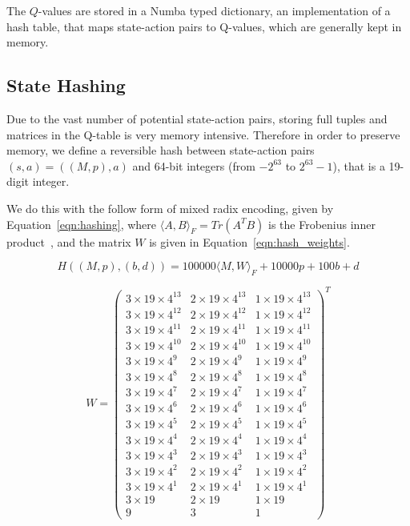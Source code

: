 \documentclass{article}
\begin{document}
The $Q$-values are stored in a Numba typed dictionary, an implementation of a
hash table, that maps state-action pairs to Q-values, which are generally kept
in memory.


\subsection{State Hashing}\label{sec:hashing}
Due to the vast number of potential state-action pairs, storing full tuples and
matrices in the Q-table is very memory intensive.
Therefore in order to preserve memory, we define a reversible hash between
state-action pairs $(s, a) = ((M, p), a)$ and 64-bit integers (from
$-2^{63}$ to $2^{63} - 1$), that is a 19-digit integer.

We do this with the follow form of mixed radix encoding, given by
Equation~\ref{eqn:hashing}, where $\langle A, B \rangle_F = Tr(A^T B)$ is the
Frobenius inner product~\cite{calderolver25}, and the matrix $W$ is given in
Equation~\ref{eqn:hash_weights}.

\begin{equation}\label{eqn:hashing}
H((M, p), (b, d)) = 100000\langle M, W \rangle_F + 10000p + 100b + d
\end{equation}

\begin{equation}\label{eqn:hash_weights}
W = \begin{pmatrix}
3 \times 19 \times 4^{13} & 2 \times 19 \times 4^{13} & 1 \times 19 \times 4^{13} \\
3 \times 19 \times 4^{12} & 2 \times 19 \times 4^{12} & 1 \times 19 \times 4^{12} \\
3 \times 19 \times 4^{11} & 2 \times 19 \times 4^{11} & 1 \times 19 \times 4^{11} \\
3 \times 19 \times 4^{10} & 2 \times 19 \times 4^{10} & 1 \times 19 \times 4^{10} \\
3 \times 19 \times 4^9 & 2 \times 19 \times 4^9 & 1 \times 19 \times 4^9 \\
3 \times 19 \times 4^8 & 2 \times 19 \times 4^8 & 1 \times 19 \times 4^8 \\
3 \times 19 \times 4^7 & 2 \times 19 \times 4^7 & 1 \times 19 \times 4^7 \\
3 \times 19 \times 4^6 & 2 \times 19 \times 4^6 & 1 \times 19 \times 4^6 \\
3 \times 19 \times 4^5 & 2 \times 19 \times 4^5 & 1 \times 19 \times 4^5 \\
3 \times 19 \times 4^4 & 2 \times 19 \times 4^4 & 1 \times 19 \times 4^4 \\
3 \times 19 \times 4^3 & 2 \times 19 \times 4^3 & 1 \times 19 \times 4^3 \\
3 \times 19 \times 4^2 & 2 \times 19 \times 4^2 & 1 \times 19 \times 4^2 \\
3 \times 19 \times 4^1 & 2 \times 19 \times 4^1 & 1 \times 19 \times 4^1 \\
3 \times 19 & 2 \times 19 & 1 \times 19 \\
9 & 3 & 1
\end{pmatrix}^T
\end{equation}
\end{document}
